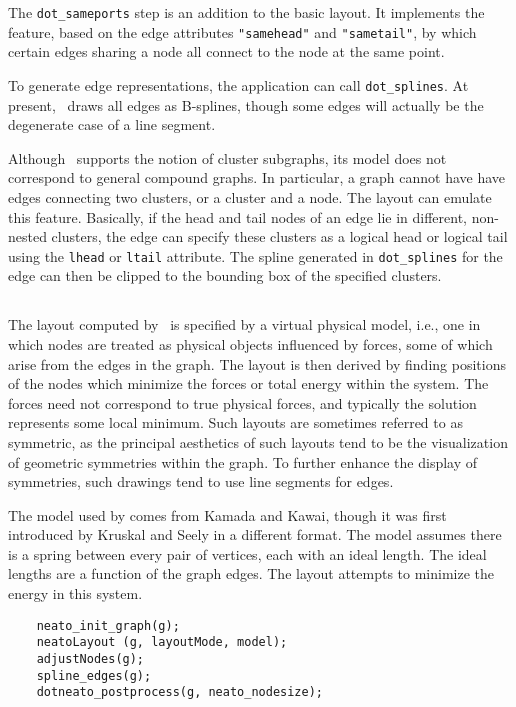 The {\tt dot\_sameports} step
is an addition to the basic layout. It
implements the feature, based on the edge attributes {\tt "samehead"}
and {\tt "sametail"}, by which certain edges sharing a node all connect
to the node at the same point.

To generate edge representations, the application can call {\tt dot\_splines}.
At present, \dot\ draws all edges as B-splines, though some edges will
actually be the degenerate case of a line segment.

Although \dot\ supports the notion of cluster subgraphs, its model does
not correspond to general compound graphs. In particular, a graph cannot
have have edges connecting two clusters, or a cluster and a node. The
layout can emulate this feature. Basically, if the head and tail nodes
of an edge lie in different, non-nested clusters, the edge can specify
these clusters as a logical head or logical tail using the {\tt lhead} or 
{\tt ltail} attribute. The
spline generated in {\tt dot\_splines} for the edge can then be clipped
to the bounding box of the specified clusters.  

\subsection{\neato}
\label{sec:neato}

The layout computed by \neato\ is specified by a virtual physical
model, i.e., one in which nodes are treated as physical objects
influenced by forces, some of which arise from the edges in the
graph. The layout is then derived by finding positions of the nodes
which minimize the forces or total energy within the system.
The forces need not correspond to true physical forces, and typically
the solution represents some local minimum. 
Such layouts are sometimes referred to as symmetric, as the
principal aesthetics of such layouts tend to be the visualization
of geometric symmetries within the graph. To further enhance the
display of symmetries, such drawings tend to use line segments for edges.

The model used by \neato comes from Kamada and Kawai\cite{kk}, 
though it was first introduced by Kruskal and Seely\cite{kruskal} in a 
different format. 
The model assumes there is a spring between
every pair of vertices, each with an ideal length. The ideal lengths
are a function of the graph edges. The layout attempts to minimize the
energy in this system.

\begin{verbatim}
    neato_init_graph(g);
    neatoLayout (g, layoutMode, model); 
    adjustNodes(g);
    spline_edges(g);
    dotneato_postprocess(g, neato_nodesize);
\end{verbatim}

